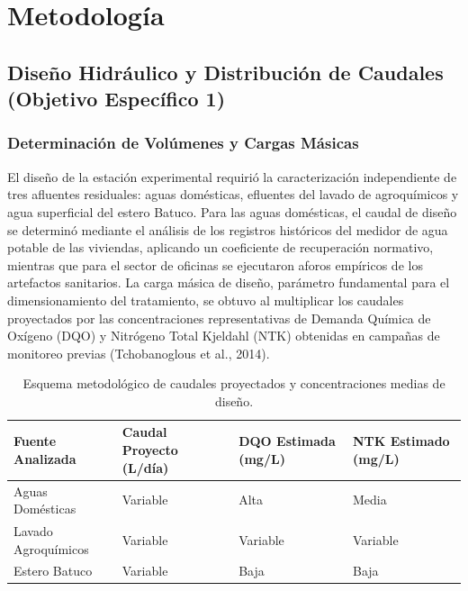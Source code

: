 \documentclass[12pt, letterpaper]{report}
\begin{document}
\chapter{Metodología}

\section{Diseño Hidráulico y Distribución de Caudales (Objetivo Específico 1)}

\subsection{Determinación de Volúmenes y Cargas Másicas}
El diseño de la estación experimental requirió la caracterización independiente de tres afluentes residuales: aguas domésticas, efluentes del lavado de agroquímicos y agua superficial del estero Batuco. Para las aguas domésticas, el caudal de diseño se determinó mediante el análisis de los registros históricos del medidor de agua potable de las viviendas, aplicando un coeficiente de recuperación normativo, mientras que para el sector de oficinas se ejecutaron aforos empíricos de los artefactos sanitarios. La carga másica de diseño, parámetro fundamental para el dimensionamiento del tratamiento, se obtuvo al multiplicar los caudales proyectados por las concentraciones representativas de Demanda Química de Oxígeno (DQO) y Nitrógeno Total Kjeldahl (NTK) obtenidas en campañas de monitoreo previas (Tchobanoglous et al., 2014).

\begin{table}[H]
    \centering
    \caption{Esquema metodológico de caudales proyectados y concentraciones medias de diseño.}
    \vspace{0.2cm}
    \label{tab:caracterizacion_afluentes}
    \begin{tabular}{|>{\raggedright\arraybackslash}p{4cm}|>{\centering\arraybackslash}p{3.3cm}|>{\centering\arraybackslash}p{3.3cm}|>{\centering\arraybackslash}p{3.3cm}|}
        \hline
        \textbf{Fuente Analizada} & \textbf{Caudal Proyecto (L/día)} & \textbf{DQO Estimada (mg/L)} & \textbf{NTK Estimado (mg/L)} \\
        \hline
        Aguas Domésticas & Variable & Alta & Media \\
        Lavado Agroquímicos & Variable & Variable & Variable \\
        Estero Batuco & Variable & Baja & Baja \\
        \hline
    \end{tabular}
\end{table}
\end{document}
